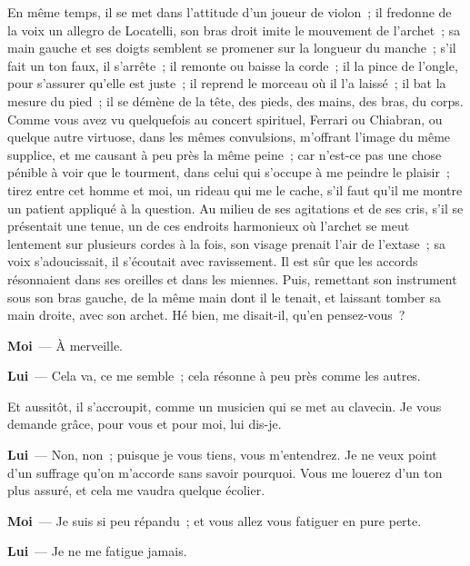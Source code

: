 \documentclass[french,twoside]{book} %
\newcommand{\labelchar}[1]{\textbf{\color{rubric} #1}}
\begin{document}
En même temps, il se met dans l’attitude d’un joueur de violon ; il fredonne de la voix un allegro de Locatelli, son bras droit imite le mouvement de l’archet ; sa main gauche et ses doigts semblent se promener sur la longueur du manche ; s’il fait un ton faux, il s’arrête ; il remonte ou baisse la corde ; il la pince de l’ongle, pour s’assurer qu’elle est juste ; il reprend le morceau où il l’a laissé ; il bat la mesure du pied ; il se démène de la tête, des pieds, des mains, des bras, du corps. Comme vous avez vu quelquefois au concert spirituel, Ferrari ou Chiabran, ou quelque autre virtuose, dans les mêmes convulsions, m’offrant l’image du même supplice, et me causant à peu près la même peine ; car n’est-ce pas une chose pénible à voir que le tourment, dans celui qui s’occupe à me peindre le plaisir ; tirez entre cet homme et moi, un rideau qui me le cache, s’il faut qu’il me montre un patient appliqué à la question. Au milieu de ses agitations et de ses cris, s’il se présentait une tenue, un de ces endroits harmonieux où l’archet se meut lentement sur plusieurs cordes à la fois, son visage prenait l’air de l’extase ; sa voix s’adoucissait, il s’écoutait avec ravissement. Il est sûr que les accords résonnaient dans ses oreilles et dans les miennes. Puis, remettant son instrument sous son bras gauche, de la même main dont il le tenait, et laissant tomber sa main droite, avec son archet. Hé bien, me disait-il, qu’en pensez-vous ?\par
\labelchar{Moi} — À merveille.\par
\labelchar{Lui} — Cela va, ce me semble ; cela résonne à peu près comme les autres.\par
Et aussitôt, il s’accroupit, comme un musicien qui se met au clavecin. Je vous demande grâce, pour vous et pour moi, lui dis-je.\par
\labelchar{Lui} — Non, non ; puisque je vous tiens, vous m’entendrez. Je ne veux point d’un suffrage qu’on m’accorde sans savoir pourquoi. Vous me louerez d’un ton plus assuré, et cela me vaudra quelque écolier.\par
\labelchar{Moi} — Je suis si peu répandu ; et vous allez vous fatiguer en pure perte.\par
\labelchar{Lui} — Je ne me fatigue jamais.\par
\end{document}
